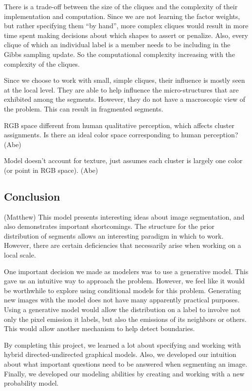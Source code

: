 \documentclass[12pt]{article}
\begin{document}
There is a trade-off between the size of the cliques and the complexity of their
implementation and computation. Since we are not learning the factor weights,
but rather specifying them ``by hand'', more complex cliques would result in
more time spent making decisions about which shapes to assert or penalize.
Also, every clique of which an individual label is a member needs to be
including in the Gibbs sampling update. So the computational complexity
increasing with the complexity of the cliques.

Since we choose to work with small, simple cliques, their influence is mostly
seen at the local level. They are able to help influence the micro-structures
that are exhibited among the segments. However, they do not have a macroscopic
view of the problem. This can result in fragmented segments.

RGB space different from human qualitative perception, which affects cluster assignments.
Is there an ideal color space corresponding to human perception? (Abe)

Model doesn't account for texture, just assumes each cluster is largely one color (or point 
in RGB space). (Abe)


\subsection*{Conclusion} (Matthew)
This model presents interesting ideas about image segmentation, and also
demonstrates important shortcomings. The structure for the prior distribution
of segments allows an interesting paradigm in which to work. However, there are
certain deficiencies that necessarily arise when working on a local scale.

One important decision we made as modelers was to use a generative model. This
gave us an intuitive way to approach the problem. However, we feel like it
would be worthwhile to explore using conditional models for this problem.
Generating new images with the model does not have many apparently practical
purposes. Using a generative model would allow the distribution on a label to
involve not only the pixel emission it labels, but also the emissions of its
neighbors or others. This would allow another mechanism to help detect
boundaries.

By completing this project, we learned a lot about specifying and working with
hybrid directed-undirected graphical models. Also, we developed our intuition
about what important questions need to be answered when segmenting an image.
Finally, we developed our modeling abilities by creating and working with a new
probability model.
\end{document}

